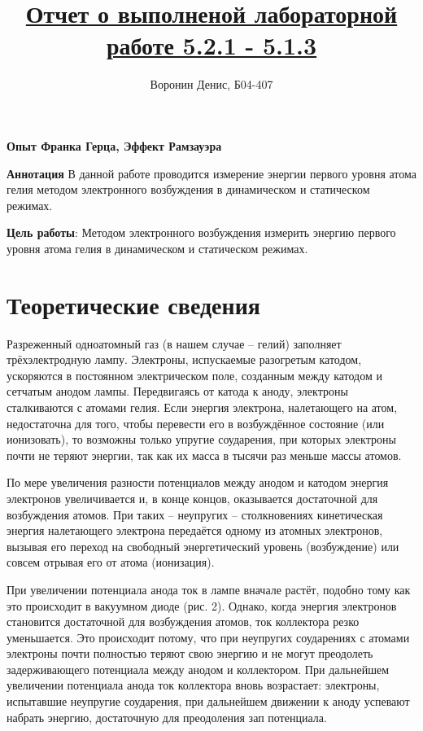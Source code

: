 \documentclass[a4paper]{article}
\title{\underline{Отчет о выполненой лабораторной работе 5.2.1 - 5.1.3}}
\author{Воронин Денис, Б04-407}
\begin{document}
\maketitle

\begin{center}
\textbf{\Large Опыт Франка Герца, Эффект Рамзауэра}
\end{center}

\textbf{Аннотация}
В данной работе проводится измерение энергии первого уровня атома гелия методом электронного возбуждения в динамическом и статическом режимах.

\textbf{Цель работы}: Методом электронного возбуждения измерить энергию первого уровня атома гелия в динамическом и статическом режимах.

\section{Теоретические сведения}

Разреженный одноатомный газ (в нашем случае -- гелий) заполняет трёхэлектродную лампу. Электроны, испускаемые разогретым катодом, ускоряются в постоянном электрическом поле, созданным между катодом и сетчатым анодом лампы. Передвигаясь от катода к аноду, электроны сталкиваются с атомами гелия. Если энергия электрона, налетающего на атом, недостаточна для того, чтобы перевести его в возбуждённое состояние (или ионизовать), то возможны только упругие соударения, при которых электроны почти не теряют энергии, так как их масса в тысячи раз меньше массы атомов.


По мере увеличения разности потенциалов между анодом и катодом энергия электронов увеличивается и, в конце концов, оказывается достаточной для возбуждения атомов. При таких -- неупругих -- столкновениях кинетическая энергия налетающего электрона передаётся одному из атомных электронов, вызывая его переход на свободный энергетический уровень (возбуждение) или совсем отрывая его от атома (ионизация).

При увеличении потенциала анода ток в лампе вначале растёт, подобно тому как это происходит в вакуумном диоде (рис. 2). Однако, когда энергия электронов становится достаточной для возбуждения атомов, ток коллектора резко уменьшается. Это происходит потому, что при неупругих соударениях с атомами электроны почти полностью теряют свою энергию и не могут преодолеть задерживающего потенциала между анодом и коллектором. При дальнейшем увеличении потенциала анода ток коллектора вновь возрастает: электроны, испытавшие неупругие соударения, при дальнейшем движении к аноду успевают набрать энергию, достаточную для преодоления зап потенциала.
\end{document}
